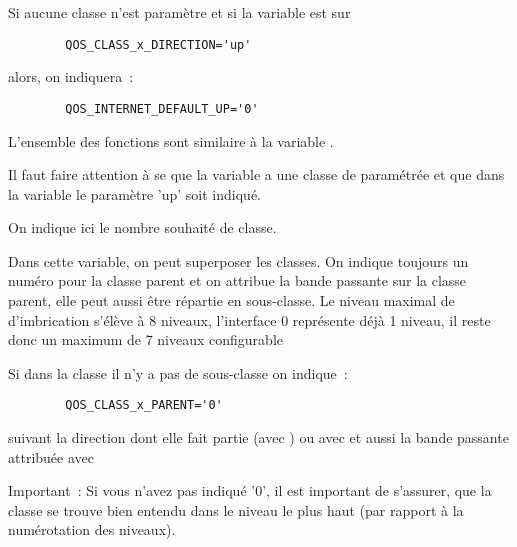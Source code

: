 \begin{description}
    Si aucune classe n'est paramètre et si la variable est sur
\begin{example}
\begin{verbatim}
        QOS_CLASS_x_DIRECTION='up'
\end{verbatim}
\end{example}
    alors, on indiquera~:
\begin{example}
\begin{verbatim}
        QOS_INTERNET_DEFAULT_UP='0'
\end{verbatim}
\end{example}

    L'ensemble des fonctions sont similaire à la variable .

    Il faut faire attention à se que la variable 
    a une classe de paramétrée et que dans la variable 
    le paramètre 'up' soit indiqué.


    On indique ici le nombre souhaité de classe.


    Dans cette variable, on peut superposer les classes. On indique toujours
    un numéro pour la classe parent et on attribue la bande passante sur la classe
    parent, elle peut aussi être répartie en sous-classe. Le niveau maximal de
    d'imbrication s'élève à 8 niveaux, l'interface 0 représente déjà 1 niveau,
    il reste donc un maximum de 7 niveaux configurable

    Si dans la classe il n'y a pas de sous-classe on indique~:

\begin{example}
\begin{verbatim}
        QOS_CLASS_x_PARENT='0'
\end{verbatim}
\end{example}

    suivant la direction dont elle fait partie (avec
   ) ou avec
    et aussi la bande passante attribuée
    avec 

    Important~: Si vous n'avez pas indiqué '0', il est important de s'assurer,
    que la classe se trouve bien entendu dans le niveau le plus haut (par rapport
    à la numérotation des niveaux).


\end{description}

